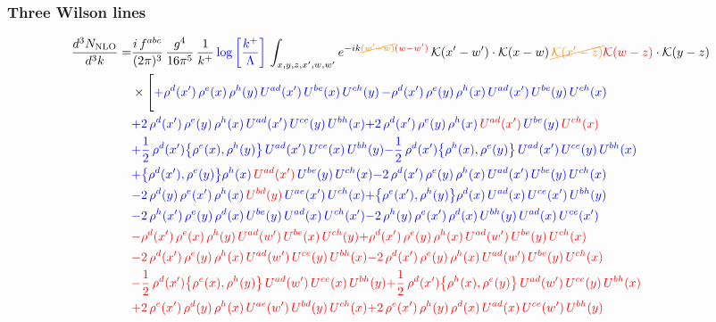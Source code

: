 \documentclass[9pt]{article}
\numberwithin{equation}{section}
\begin{document}
\subsubsection{Three Wilson lines}
\begin{align}
    \frac{d^{3}N_{\rm NLO}}{d^{3}k}= & \frac{i\,f^{abc}}{(2\pi)^{3}}\,\frac{g^{4}}{16\pi^{5}}\,\frac{1}{k^{+}}\,{\color{blue}\log{\left[\frac{k^{+}}{\Lambda}\right]}}\,\int_{x,y,z,x',w,w'}e^{-ik{\color{orange}\cancel{(w'-w)}}{\color{red}(w-w')}}\,\mathcal{K}(x'-w')\cdot\mathcal{K}(x-w)\,{\color{orange}\cancel{\mathcal{K}(x'-z)}}{\color{red}\mathcal{K}(w-z)}\cdot\mathcal{K}(y-z)\notag \\ & \times\Bigg[{\color{blue}+\rho^{d}(x')\,\rho^{e}(x)\,\rho^{h}(y)\,U^{ad}(x')\,U^{be}(x)\,U^{ch}(y)}\,{\color{blue}-\rho^{d}(x')\,\rho^{e}(y)\,\rho^{h}(x)\,U^{ad}(x')\,U^{be}(y)\,U^{ch}(x)}\notag \\ &{\color{blue}+2\,\rho^{d}(x')\,\rho^{e}(y)\,\rho^{h}(x)\,U^{ad}(x')\,U^{ce}(y)\,U^{bh}(x)}{\color{blue}+2\,\rho^{d}(x')\,\rho^{e}(y)\,\rho^{h}(x)\, {\color{red}U^{ad}(x')}\,U^{be}(y)\,{\color{red}U^{ch}(x)}}\notag \\ & {\color{blue}+\frac{1}{2}\,\rho^{d}(x')\big\{\rho^{e}(x),\rho^{h}(y)\big\}\,U^{ad}(x')\,U^{ce}(x)\,U^{bh}(y)}{\color{blue}-\frac{1}{2}\,\rho^{d}(x')\big\{\rho^{h}(x),\rho^{e}(y)\big\}\,U^{ad}(x')\,U^{ce}(y)\,U^{bh}(x)}\notag \\ & {\color{blue}+\big\{\rho^{d}(x'),\rho^{e}(y)\big\}\rho^{h}(x)\,{\color{red}U^{ad}(x')}\,U^{be}(y)\,U^{ch}(x)}{\color{blue}-2\,\rho^{d}(x')\,\rho^{e}(y)\, \rho^{h}(x)\, U^{ad}(x')\,U^{be}(y)\,U^{ch}(x)}\notag \\ &{\color{blue}-2\,\rho^{d}(y)\,\rho^{e}(x')\, \rho^{h}(x)\, {\color{red}U^{bd}(y)}\,U^{ae}(x')\,U^{ch}(x)}{\color{blue}+\big\{\rho^{e}(x'),\rho^{h}(y)\big\}\rho^{d}(x)\,U^{ad}(x)\,U^{ce}(x')\,U^{bh}(y)}\notag \\ & {\color{blue}-2\,\rho^{h}(x')\,\rho^{e}(y)\,\rho^{d}(x)\,U^{be}(y)\,U^{ad}(x)\,U^{ch}(x')}{\color{blue}-2\,\rho^{h}(y)\,\rho^{e}(x')\,\rho^{d}(x)\,U^{bh}(y)\,U^{ad}(x)\,U^{ce}(x')}\notag \\ & {\color{red}-\rho^{d}(x')\,\rho^{e}(x)\,\rho^{h}(y)\,U^{ad}(w')\,U^{be}(x)\,U^{ch}(y)}{\color{red}+\rho^{d}(x')\,\rho^{e}(y)\,\rho^{h}(x)\,U^{ad}(w')\,U^{be}(y)\,U^{ch}(x)}\notag \\ &{\color{red}-2\,\rho^{d}(x')\,\rho^{e}(y)\,\rho^{h}(x)\,U^{ad}(w')\,U^{ce}(y)\,U^{bh}(x)} {\color{red}-2\,\rho^{d}(x')\,\rho^{e}(y)\,\rho^{h}(x)\, {\color{red}U^{ad}(w')}\,U^{be}(y)\,{\color{red}U^{ch}(x)}}\notag \\ & {\color{red}-\frac{1}{2}\,\rho^{d}(x')\big\{\rho^{e}(x),\rho^{h}(y)\big\}\,U^{ad}(w')\,U^{ce}(x)\,U^{bh}(y)}{\color{red}+\frac{1}{2}\,\rho^{d}(x')\big\{\rho^{h}(x),\rho^{e}(y)\big\}\,U^{ad}(w')\,U^{ce}(y)\,U^{bh}(x)}\notag \\ & {\color{red}+2\,\rho^{e}(x')\,\rho^{d}(y)\, \rho^{h}(x)\, U^{ae}(w')\,U^{bd}(y)\,U^{ch}(x)}{\color{red}+2\,\rho^{e}(x')\,\rho^{h}(y)\,\rho^{d}(x)\,U^{ad}(x)\,U^{ce}(w')\,U^{bh}(y)}\notag \\ & 
\end{align}
\end{document}
